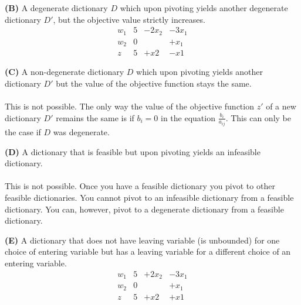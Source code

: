\documentclass[11pt]{article}
\begin{document}
\medskip

\noindent\textbf{(B)} A degenerate dictionary $D$ which upon pivoting
yields another degenerate dictionary $D'$, but the objective value strictly
increases.
\\
\[\begin{array}{r|cccc}
w_1 & 5 & -2x_2 & -3x_1\\ 
w_2 & 0 && +x_1 \\
\hline
z & 5 & +x2 & -x1
\end{array}\]  

\medskip

\noindent\textbf{(C)} A non-degenerate dictionary $D$ which upon pivoting
yields another dictionary $D'$ but the value of the objective function
stays the same.
\\
\\
This is not possible.  The only way the value of the objective function $z'$ of a new dictionary $D'$ remains the same is if $b_i = 0$ in the equation $\frac{b_i}{a_{ij}}$.  This can only be the case if $D$ was degenerate.

\medskip

\noindent\textbf{(D)} A dictionary that is feasible but upon pivoting
yields an infeasible dictionary.
\\
\\
This is not possible.  Once you have a feasible dictionary you pivot to other feasible dictionaries.  You cannot pivot to an infeasible dictionary from a feasible dictionary.  You can, however, pivot to a degenerate dictionary from a feasible dictionary.

\medskip

\noindent\textbf{(E)} A dictionary that does not have leaving variable
(is unbounded) for one choice of entering variable but has a leaving
variable for a different choice of an entering variable.
\\
\[\begin{array}{r|cccc}
w_1 & 5 & +2x_2 & -3x_1\\ 
w_2 & 0 && +x_1 \\
\hline
z & 5 & +x2 & +x1
\end{array}\] 


\bigskip
\end{document}
